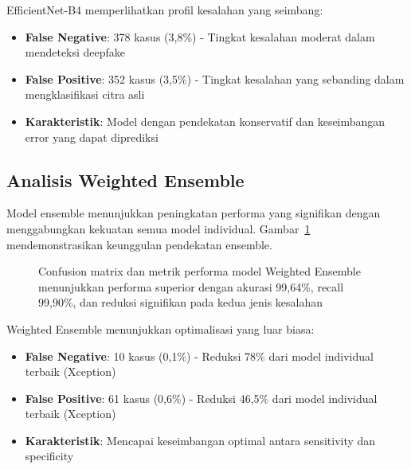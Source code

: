 EfficientNet-B4 memperlihatkan profil kesalahan yang seimbang:
\begin{itemize}
    \item \textbf{False Negative}: 378 kasus (3,8\%) - Tingkat kesalahan moderat dalam mendeteksi deepfake
    \item \textbf{False Positive}: 352 kasus (3,5\%) - Tingkat kesalahan yang sebanding dalam mengklasifikasi citra asli
    \item \textbf{Karakteristik}: Model dengan pendekatan konservatif dan keseimbangan error yang dapat diprediksi
\end{itemize}

\subsection{Analisis Weighted Ensemble}

Model ensemble menunjukkan peningkatan performa yang signifikan dengan menggabungkan kekuatan semua model individual. Gambar~\ref{fig:conf_matrix_ensemble} mendemonstrasikan keunggulan pendekatan ensemble.

\begin{figure}[H]
    \centering
    \caption{Confusion matrix dan metrik performa model Weighted Ensemble menunjukkan performa superior dengan akurasi 99,64\%, recall 99,90\%, dan reduksi signifikan pada kedua jenis kesalahan}
    \label{fig:conf_matrix_ensemble}
\end{figure}

Weighted Ensemble menunjukkan optimalisasi yang luar biasa:
\begin{itemize}
    \item \textbf{False Negative}: 10 kasus (0,1\%) - Reduksi 78\% dari model individual terbaik (Xception)
    \item \textbf{False Positive}: 61 kasus (0,6\%) - Reduksi 46,5\% dari model individual terbaik (Xception)
    \item \textbf{Karakteristik}: Mencapai keseimbangan optimal antara sensitivity dan specificity
\end{itemize}


